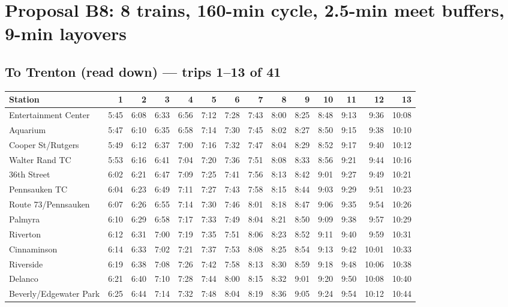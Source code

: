 \section{Proposal B8: 8 trains, 160-min cycle, 2.5-min meet buffers, 9-min layovers}\label{tt:proposal_B8}
\subsection*{To Trenton (read down) --- trips 1--13 of 41}
\begin{center}\footnotesize\setlength{\tabcolsep}{3pt}\begin{tabular}{@{}lrrrrrrrrrrrrr@{}}\toprule
Station & 1 & 2 & 3 & 4 & 5 & 6 & 7 & 8 & 9 & 10 & 11 & 12 & 13 \\\midrule
Entertainment Center & 5:45 & 6:08 & 6:33 & 6:56 & 7:12 & 7:28 & 7:43 & 8:00 & 8:25 & 8:48 & 9:13 & 9:36 & 10:08 \\
Aquarium & 5:47 & 6:10 & 6:35 & 6:58 & 7:14 & 7:30 & 7:45 & 8:02 & 8:27 & 8:50 & 9:15 & 9:38 & 10:10 \\
Cooper St/Rutgers & 5:49 & 6:12 & 6:37 & 7:00 & 7:16 & 7:32 & 7:47 & 8:04 & 8:29 & 8:52 & 9:17 & 9:40 & 10:12 \\
Walter Rand TC & 5:53 & 6:16 & 6:41 & 7:04 & 7:20 & 7:36 & 7:51 & 8:08 & 8:33 & 8:56 & 9:21 & 9:44 & 10:16 \\
36th Street & 6:02 & 6:21 & 6:47 & 7:09 & 7:25 & 7:41 & 7:56 & 8:13 & 8:42 & 9:01 & 9:27 & 9:49 & 10:21 \\
Pennsauken TC & 6:04 & 6:23 & 6:49 & 7:11 & 7:27 & 7:43 & 7:58 & 8:15 & 8:44 & 9:03 & 9:29 & 9:51 & 10:23 \\
Route 73/Pennsauken & 6:07 & 6:26 & 6:55 & 7:14 & 7:30 & 7:46 & 8:01 & 8:18 & 8:47 & 9:06 & 9:35 & 9:54 & 10:26 \\
Palmyra & 6:10 & 6:29 & 6:58 & 7:17 & 7:33 & 7:49 & 8:04 & 8:21 & 8:50 & 9:09 & 9:38 & 9:57 & 10:29 \\
Riverton & 6:12 & 6:31 & 7:00 & 7:19 & 7:35 & 7:51 & 8:06 & 8:23 & 8:52 & 9:11 & 9:40 & 9:59 & 10:31 \\
Cinnaminson & 6:14 & 6:33 & 7:02 & 7:21 & 7:37 & 7:53 & 8:08 & 8:25 & 8:54 & 9:13 & 9:42 & 10:01 & 10:33 \\
Riverside & 6:19 & 6:38 & 7:08 & 7:26 & 7:42 & 7:58 & 8:13 & 8:30 & 8:59 & 9:18 & 9:48 & 10:06 & 10:38 \\
Delanco & 6:21 & 6:40 & 7:10 & 7:28 & 7:44 & 8:00 & 8:15 & 8:32 & 9:01 & 9:20 & 9:50 & 10:08 & 10:40 \\
Beverly/Edgewater Park & 6:25 & 6:44 & 7:14 & 7:32 & 7:48 & 8:04 & 8:19 & 8:36 & 9:05 & 9:24 & 9:54 & 10:12 & 10:44 \\

\end{tabular}
\end{center}
